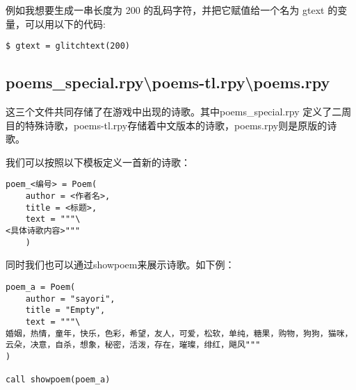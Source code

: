 \documentclass[../../Main.tex]{subfiles}
\begin{document}
例如我想要生成一串长度为 200 的乱码字符，并把它赋值给一个名为 gtext 的变量，可以用以下的代码:
\begin{lstlisting}
$ gtext = glitchtext(200)
\end{lstlisting}

\subsection{poems\_special.rpy\textbackslash poems-tl.rpy\textbackslash poems.rpy}

这三个文件共同存储了在游戏中出现的诗歌。其中poems\_special.rpy 定义了二周目的特殊诗歌，poems-tl.rpy存储着中文版本的诗歌，poems.rpy则是原版的诗歌。

我们可以按照以下模板定义一首新的诗歌：
\begin{lstlisting}
poem_<编号> = Poem(
    author = <作者名>,
    title = <标题>,
    text = """\
<具体诗歌内容>"""
    )
\end{lstlisting}

同时我们也可以通过showpoem来展示诗歌。如下例：
\begin{lstlisting}
poem_a = Poem(
    author = "sayori",
    title = "Empty",
    text = """\
婚姻，热情，童年，快乐，色彩，希望，友人，可爱，松软，单纯，糖果，购物，狗狗，猫咪，云朵，决意，自杀，想象，秘密，活泼，存在，璀璨，绯红，飓风"""
)

call showpoem(poem_a)
\end{lstlisting}
\end{document}
